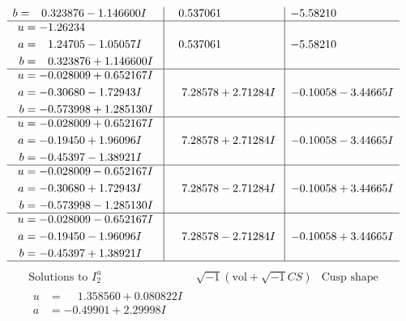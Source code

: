 \documentclass[1p]{elsarticle_modified}
\theoremstyle{definition}
\newcommand{\I}{\sqrt{-1}}
\begin{document}
$$\begin{array}{c|c|c}
\begin{aligned}
b &= \phantom{-}0.323876 - 1.146600 I\end{aligned}
 & \phantom{-}0.537061\phantom{ +0.000000I} & -5.58210\phantom{ +0.000000I} \\ \hline\begin{aligned}
u &= -1.26234\phantom{ +0.000000I} \\
a &= \phantom{-}1.24705 - 1.05057 I \\
b &= \phantom{-}0.323876 + 1.146600 I\end{aligned}
 & \phantom{-}0.537061\phantom{ +0.000000I} & -5.58210\phantom{ +0.000000I} \\ \hline\begin{aligned}
u &= -0.028009 + 0.652167 I \\
a &= -0.30680 - 1.72943 I \\
b &= -0.573998 + 1.285130 I\end{aligned}
 & \phantom{-}7.28578 + 2.71284 I & -0.10058 - 3.44665 I \\ \hline\begin{aligned}
u &= -0.028009 + 0.652167 I \\
a &= -0.19450 + 1.96096 I \\
b &= -0.45397 - 1.38921 I\end{aligned}
 & \phantom{-}7.28578 + 2.71284 I & -0.10058 - 3.44665 I \\ \hline\begin{aligned}
u &= -0.028009 - 0.652167 I \\
a &= -0.30680 + 1.72943 I \\
b &= -0.573998 - 1.285130 I\end{aligned}
 & \phantom{-}7.28578 - 2.71284 I & -0.10058 + 3.44665 I \\ \hline\begin{aligned}
u &= -0.028009 - 0.652167 I \\
a &= -0.19450 - 1.96096 I \\
b &= -0.45397 + 1.38921 I\end{aligned}
 & \phantom{-}7.28578 - 2.71284 I & -0.10058 + 3.44665 I\\
 \hline 
 \end{array}$$\newpage$$\begin{array}{c|c|c}  
\text{Solutions to }I^u_{2}& \I (\text{vol} + \sqrt{-1}CS) & \text{Cusp shape}\\
 \hline 
\begin{aligned}
u &= \phantom{-}1.358560 + 0.080822 I \\
a &= -0.49901 + 2.29998 I \\

\end{aligned}
\end{array}$$
\end{document}
